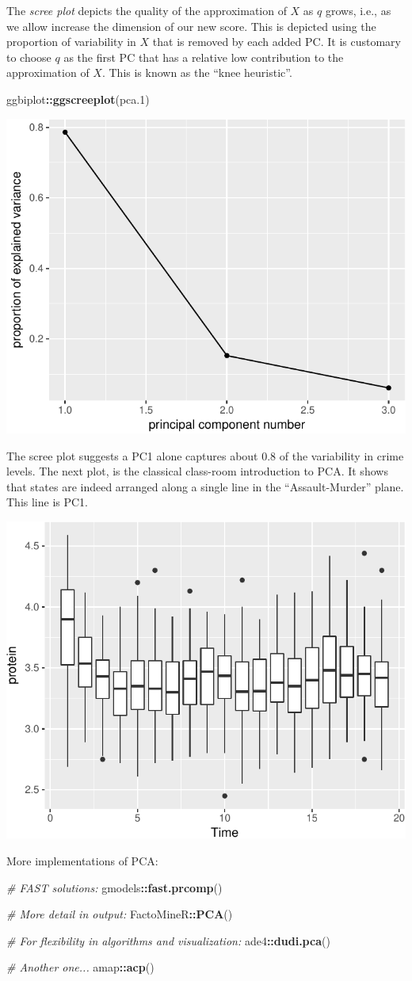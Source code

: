 \documentclass[]{book}
\newenvironment{Shaded}{\begin{snugshade}}{\end{snugshade}}
\newcommand{\CommentTok}[1]{\textcolor[rgb]{0.56,0.35,0.01}{\textit{#1}}}
\newcommand{\FloatTok}[1]{\textcolor[rgb]{0.00,0.00,0.81}{#1}}
\newcommand{\KeywordTok}[1]{\textcolor[rgb]{0.13,0.29,0.53}{\textbf{#1}}}
\newcommand{\NormalTok}[1]{#1}
\newcommand{\OperatorTok}[1]{\textcolor[rgb]{0.81,0.36,0.00}{\textbf{#1}}}
\theoremstyle{definition}
\theoremstyle{definition}
\theoremstyle{definition}
\theoremstyle{remark}
\begin{document}
The \emph{scree plot} depicts the quality of the approximation of \(X\) as \(q\) grows, i.e., as we allow increase the dimension of our new score.
This is depicted using the proportion of variability in \(X\) that is removed by each added PC.
It is customary to choose \(q\) as the first PC that has a relative low contribution to the approximation of \(X\).
This is known as the ``knee heuristic''.

\begin{Shaded}
\begin{Highlighting}[]
\NormalTok{ggbiplot}\OperatorTok{::}\KeywordTok{ggscreeplot}\NormalTok{(pca}\FloatTok{.1}\NormalTok{)}
\end{Highlighting}
\end{Shaded}

\includegraphics[width=0.5\linewidth]{Rcourse_files/figure-latex/scree-1}

The scree plot suggests a PC1 alone captures about 0.8 of the variability in crime levels.
The next plot, is the classical class-room introduction to PCA.
It shows that states are indeed arranged along a single line in the ``Assault-Murder'' plane. This line is PC1.

\includegraphics[width=0.5\linewidth]{Rcourse_files/figure-latex/unnamed-chunk-241-1}

More implementations of PCA:

\begin{Shaded}
\begin{Highlighting}[]
\CommentTok{# FAST solutions:}
\NormalTok{gmodels}\OperatorTok{::}\KeywordTok{fast.prcomp}\NormalTok{()}

\CommentTok{# More detail in output:}
\NormalTok{FactoMineR}\OperatorTok{::}\KeywordTok{PCA}\NormalTok{()}

\CommentTok{# For flexibility in algorithms and visualization:}
\NormalTok{ade4}\OperatorTok{::}\KeywordTok{dudi.pca}\NormalTok{()}

\CommentTok{# Another one...}
\NormalTok{amap}\OperatorTok{::}\KeywordTok{acp}\NormalTok{()}
\end{Highlighting}
\end{Shaded}
\end{document}
